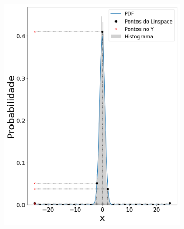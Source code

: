 \begin{figure}[H]
\begin{subfigure}[b]{0.3\textwidth}
		\includegraphics[width=\linewidth]{./figuras/normal_1_25}
		\caption{}
		\label{fig:randn_outlin}
	\end{subfigure}
	\hfill
	\begin{subfigure}[b]{0.3\textwidth}
		\centering 

\end{subfigure}
\end{figure}
